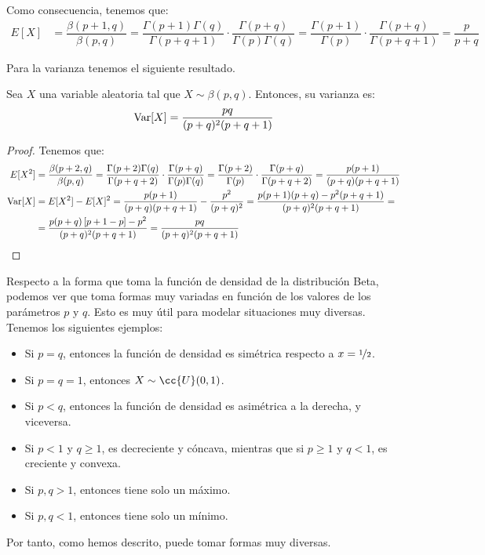 Como consecuencia, tenemos que:
\begin{align*}
    E[X] &= \dfrac{\beta(p+1,q)}{\beta(p,q)}
    = \dfrac{\Gamma(p+1)\Gamma(q)}{\Gamma(p+q+1)} \cdot \dfrac{\Gamma(p+q)}{\Gamma(p)\Gamma(q)} = \dfrac{\Gamma(p+1)}{\Gamma(p)} \cdot \dfrac{\Gamma(p+q)}{\Gamma(p+q+1)} = \dfrac{p}{p+q}
\end{align*}

Para la varianza tenemos el siguiente resultado.
\begin{prop}
    Sea $X$ una variable aleatoria tal que $X\sim \beta(p,q)$. Entonces, su varianza es:
    \begin{equation*}
        \operatorname{Var}[X] = \dfrac{pq}{(p+q)^2(p+q+1)}
    \end{equation*}
\end{prop}
\begin{proof} Tenemos que:
    \begin{align*}
        E[X^2] &= \dfrac{\beta(p+2,q)}{\beta(p,q)}
        = \dfrac{\Gamma(p+2)\Gamma(q)}{\Gamma(p+q+2)} \cdot \dfrac{\Gamma(p+q)}{\Gamma(p)\Gamma(q)} = \dfrac{\Gamma(p+2)}{\Gamma(p)} \cdot \dfrac{\Gamma(p+q)}{\Gamma(p+q+2)} = \dfrac{p(p+1)}{(p+q)(p+q+1)} \\
        \operatorname{Var}[X] &= E[X^2] - E[X]^2 = \dfrac{p(p+1)}{(p+q)(p+q+1)} - \dfrac{p^2}{(p+q)^2}
        = \dfrac{p(p+1)(p+q) -p^2(p+q+1)}{(p+q)^2(p+q+1)} =\\
        &= \dfrac{p(p+q)\left[ p+1-p \right]-p^2}{(p+q)^2(p+q+1)} = \dfrac{pq}{(p+q)^2(p+q+1)}
    \end{align*}
\end{proof}


Respecto a la forma que toma la función de densidad de la distribución Beta, podemos ver que toma formas muy variadas en función de los valores de los parámetros $p$ y $q$.
Esto es muy útil para modelar situaciones muy diversas. Tenemos los siguientes ejemplos:
\begin{itemize}
    \item Si $p=q$, entonces la función de densidad es simétrica respecto a $x=\nicefrac{1}{2}$.
    \item Si $p=q=1$, entonces $X\sim \cc{U}(0,1)$.
    \item Si $p<q$, entonces la función de densidad es asimétrica a la derecha, y viceversa.
    \item Si $p<1$ y $q\geq 1$, es decreciente y cóncava, mientras que si $p\geq 1$ y $q<1$, es creciente y convexa.
    \item Si $p,q>1$, entonces tiene solo un máximo.
    \item Si $p,q<1$, entonces tiene solo un mínimo.
\end{itemize}

Por tanto, como hemos descrito, puede tomar formas muy diversas.
